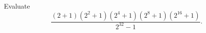 Evaluate
\[\dfrac{(2+1)\left(2^2+1\right)\left(2^4+1\right)\left(2^8+1\right)\left(2^{16}+1\right)}{2^{32}-1}.\]
